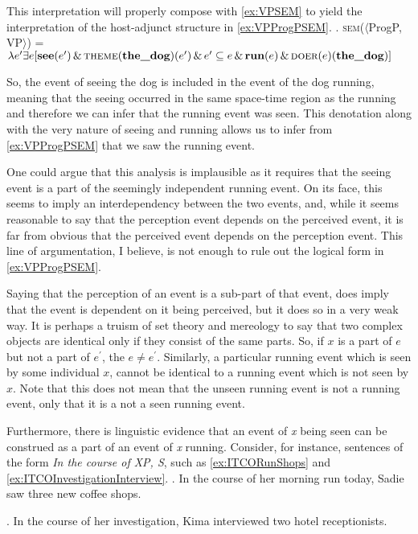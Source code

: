\documentclass[MilwayThesis]{subfiles}
\begin{document}
This interpretation will properly compose with \cref{ex:VPSEM} to yield the interpretation of the host-adjunct structure in \cref{ex:VPProgPSEM}.
\ex.\label{ex:VPProgPSEM} \textsc{sem}($\langle$ProgP, VP$\rangle$) = $\lambda e^{\prime} \exists e [ \textbf{see}(e^{\prime})\,\&\,\textsc{theme}(\textbf{the\_dog})(e^{\prime})\,\&\,e^{\prime} \subseteq e\,\&\,\textbf{run}(e)\,\&\,\textsc{doer}(e)(\textbf{the\_dog})]$

So, the event of seeing the dog is included in the event of the dog running, meaning that the seeing occurred in the same space-time region as the running and therefore we can infer that the running event was seen.
This denotation along with the very nature of seeing and running allows us to infer from \cref{ex:VPProgPSEM} that we saw the running event.

One could argue that this analysis is implausible as it requires that the seeing event is a part of the seemingly independent running event.
On its face, this seems to imply an interdependency between the two events, and, while it seems reasonable to say that the perception event depends on the perceived event, it is far from obvious that the perceived event depends on the perception event.
This line of argumentation, I believe, is not enough to rule out the logical form in \cref{ex:VPProgPSEM}.


Saying that the perception of an event is a sub-part of that event, does imply that the event is dependent on it being perceived, but it does so in a very weak way.
It is perhaps a truism of set theory and mereology to say that two complex objects are identical only if they consist of the same parts.
So, if $x$ is a part of $e$ but not a part of $e^{\prime}$, the $e \neq e^{\prime}$.
Similarly, a particular running event which is seen by some individual $x$, cannot be identical to a running event which is not seen by $x$.
Note that this does not mean that the unseen running event is not a running event, only that it is a not a seen running event.

Furthermore, there is linguistic evidence that an event of \textit{x} being seen can be construed as a part of an event of \textit{x} running.
Consider, for instance, sentences of the form \textit{In the course of XP, S}, such as \cref{ex:ITCORunShops} and \cref{ex:ITCOInvestigationInterview}.
\ex.\label{ex:ITCORunShops} In the course of her morning run today, Sadie saw three new coffee shops.

\ex.\label{ex:ITCOInvestigationInterview} In the course of her investigation, Kima interviewed two hotel receptionists.
\end{document}
